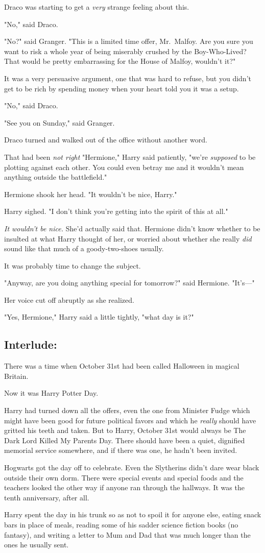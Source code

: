 Draco was starting to get a \emph{very} strange feeling about this.

"No," said Draco.

"No?" said Granger. "This is a limited time offer, Mr.~Malfoy. Are you sure you
want to risk a whole year of being miserably crushed by the Boy-Who-Lived? That
would be pretty embarrassing for the House of Malfoy, wouldn't it?"

It was a very persuasive argument, one that was hard to refuse, but you didn't
get to be rich by spending money when your heart told you it was a setup.

"No," said Draco.

"See you on Sunday," said Granger.

Draco turned and walked out of the office without another word.

That had been \emph{not right{\el}}
\sbreak
"Hermione," Harry said patiently, "we're \emph{supposed} to be plotting against
each other. You could even betray me and it wouldn't mean anything outside the
battlefield."

Hermione shook her head. "It wouldn't be nice, Harry."

Harry sighed. "I don't think you're getting into the spirit of this at all."

\emph{It wouldn't be nice.} She'd actually said that. Hermione didn't know
whether to be insulted at what Harry thought of her, or worried about whether
she really \emph{did} sound like that much of a goody-two-shoes usually.

It was probably time to change the subject.

"Anyway, are you doing anything special for tomorrow?" said Hermione. "It's\mbox{---}"

Her voice cut off abruptly as she realized.

"Yes, Hermione," Harry said a little tightly, "what day is it?"
\sbreak
\subsection{Interlude:}

There was a time when October 31st had been called Halloween in magical Britain.

Now it was Harry Potter Day.

Harry had turned down all the offers, even the one from Minister Fudge which
might have been good for future political favors and which he \emph{really}
should have gritted his teeth and taken. But to Harry, October 31st would
always be The Dark Lord Killed My Parents Day. There should have been a quiet,
dignified memorial service somewhere, and if there was one, he hadn't been
invited.

Hogwarts got the day off to celebrate. Even the Slytherins didn't dare wear
black outside their own dorm. There were special events and special foods and
the teachers looked the other way if anyone ran through the hallways. It was
the tenth anniversary, after all.

Harry spent the day in his trunk so as not to spoil it for anyone else, eating
snack bars in place of meals, reading some of his sadder science fiction books
(no fantasy), and writing a letter to Mum and Dad that was much longer than the
ones he usually sent.
